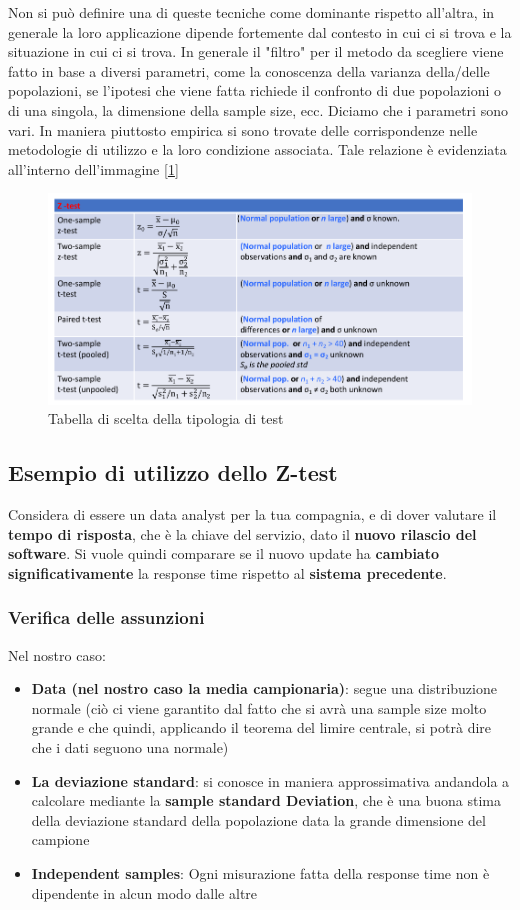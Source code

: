Non si può definire una di queste tecniche come dominante rispetto all'altra, in generale la loro applicazione dipende fortemente dal contesto in cui ci si trova e la situazione in cui ci si trova. In generale il "filtro" per il metodo da scegliere viene fatto in base a diversi parametri, come la conoscenza della varianza della/delle popolazioni, se l'ipotesi che viene fatta richiede il confronto di due popolazioni o di una singola, la dimensione della sample size, ecc. Diciamo che i parametri sono vari. In maniera piuttosto empirica si sono trovate delle corrispondenze nelle metodologie di utilizzo e la loro condizione associata. Tale relazione è evidenziata all'interno dell'immagine [\ref{img:test-situation}]

\begin{figure}[h]
\centering
\includegraphics[width=.9\textwidth]{img/chapter-4/test-situations.png}
\caption{Tabella di scelta della tipologia di test}\label{img:test-situation}
\end{figure}

\clearpage
\subsection{Esempio di utilizzo dello Z-test}
Considera di essere un data analyst per la tua compagnia, e di dover valutare il \textbf{tempo di risposta}, che è la chiave del servizio, dato il \textbf{nuovo rilascio del software}. Si vuole quindi comparare se il nuovo update ha \textbf{cambiato significativamente} la response time rispetto al \textbf{sistema precedente}.

\subsubsection{Verifica delle assunzioni}
Nel nostro caso:
\begin{itemize}
    \item \textbf{Data (nel nostro caso la media campionaria)}: segue una distribuzione normale (ciò ci viene garantito dal fatto che si avrà una sample size molto grande e che quindi, applicando il teorema del limire centrale, si potrà dire che i dati seguono una normale)
    \item \textbf{La deviazione standard}: si conosce in maniera approssimativa andandola a calcolare mediante la \textbf{sample standard Deviation}, che è una buona stima della deviazione standard della popolazione data la grande dimensione del campione
    \item \textbf{Independent samples}: Ogni misurazione fatta della response time non è dipendente in alcun modo dalle altre
\end{itemize}

